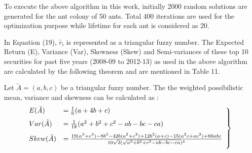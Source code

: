 \documentclass{ws-ijufks}
\begin{document}
To execute the above algorithm in this work, initially 2000 random solutions are generated for the ant colony of 50 
ants. Total 400 iterations are used for the optimization purpose while lifetime for each ant is considered as 20. 

In Equation (19), $\tilde{r_i}$ is represented as a triangular fuzzy number. The Expected Return (E), Variance (Var), 
Skewness (Skew) and Semi-variances of these top 10 securities for past five years (2008-09 to 2012-13) as used in the 
above algorithm are calculated by the following theorem and are mentioned in Table 11.

\begin{theorem}
	Let $\tilde{A}=(a,b,c)$ be a triangular fuzzy number. The  the weighted possibilistic mean, variance and skewness 
	can be calculated as \cite{Bhattacharyya2013}:
	\begin{equation}
	\begin{aligned}
	\left. \begin{array}{ll}
	\vspace{0.25cm}
	E(\tilde{A})&=\frac{1}{6}(a+4b+c)\\
	\vspace{0.25cm}
	Var(\tilde{A})&=\frac{1}{18}(a^2+b^2+c^2-ab-bc-ca)\\
	\vspace{0.25cm}
	Skew(\tilde{A})&=\frac{19(a^3+c^3)-8b^3-42b(a^2+c^2)+12b^2(a+c)-15(a^2c+ac^2)+60abc}{10\sqrt{2}(\sqrt{a^2+b^2+c^2-ab-bc-ca})^3}
	\end{array}\right\}
	\end {aligned}
	\end{equation}
\end{theorem}  
\end{document}
